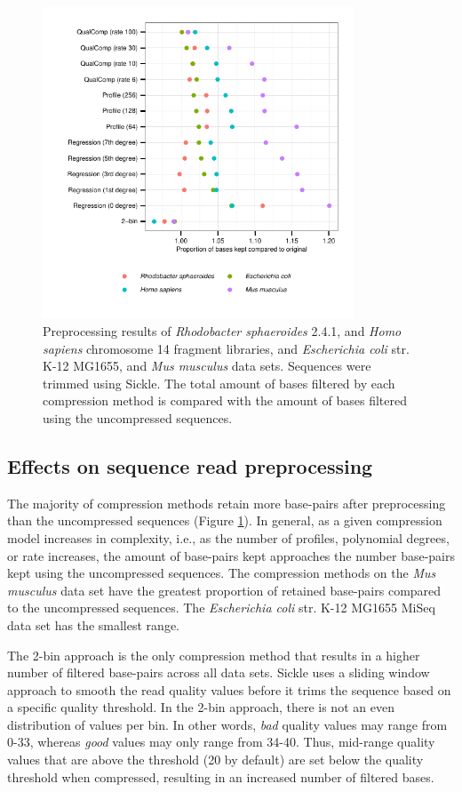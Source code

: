 \documentclass{bioinfo}
\begin{document}
\begin{figure}[!tbp]%
\centerline{\includegraphics[width=3.65in]{preprocessing_results.pdf}}
\caption{Preprocessing results of \textit{Rhodobacter sphaeroides}
  2.4.1, and \textit{Homo sapiens} chromosome 14 fragment libraries,
  and \textit{Escherichia coli} str. K-12 MG1655, and \textit{Mus
    musculus} data sets. Sequences were trimmed using Sickle. The
  total amount of bases filtered by each compression method is
  compared with the amount of bases filtered using the uncompressed
  sequences.}
  \label{fig:preprocessing}
\end{figure}

\subsection{Effects on sequence read preprocessing}

The majority of compression methods retain more base-pairs after
preprocessing than the uncompressed sequences (Figure
\ref{fig:preprocessing}). In general, as a given compression model
increases in complexity, i.e., as the number of profiles, polynomial
degrees, or rate increases, the amount of base-pairs kept approaches
the number base-pairs kept using the uncompressed sequences. The
compression methods on the \textit{Mus musculus} data set have the
greatest proportion of retained base-pairs compared to the
uncompressed sequences. The \textit{Escherichia coli} str. K-12
MG1655 MiSeq data set has the smallest range.

The 2-bin approach is the only compression method that results in a
higher number of filtered base-pairs across all data sets. Sickle
uses a sliding window approach to smooth the read quality values before
it trims the sequence based on a specific quality threshold. In the
2-bin approach, there is not an even distribution of values per bin.
In other words, \emph{bad} quality values may range from 0-33, whereas
\emph{good} values may only range from 34-40. Thus, mid-range quality
values that are above the threshold (20 by default) are set below the
quality threshold when compressed, resulting in an increased number of
filtered bases.
\end{document}
